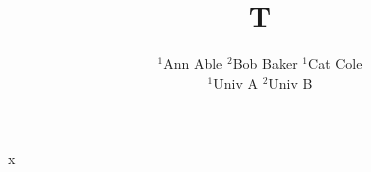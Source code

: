\documentclass{article}
\begin{document}
\title{T}
\author{$^{1}$Ann Able \: $^{2}$Bob Baker \: $^{1}$Cat Cole \\
$^1$Univ A \quad $^2$Univ B}
\maketitle
x
\end{document}

